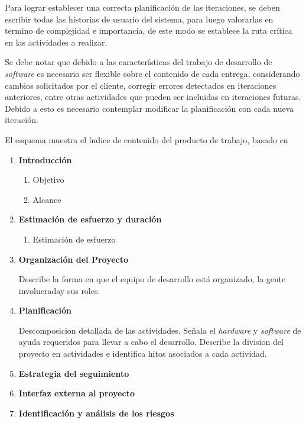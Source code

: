 Para lograr establecer una correcta planificación de las iteraciones, se deben escribir todas las historias de usuario del sistema, para luego valorarlas en termino de complejidad e importancia, de este modo se establece la ruta crítica en las actividades a realizar. 

Se debe notar que debido a las características del trabajo de desarrollo de \emph{software} es necesario ser flexible sobre el contenido de cada entrega, considerando cambios solicitados por el cliente, corregir errores detectados en iteraciones anteriores, entre otras actividades que pueden ser incluidas en iteraciones futuras. Debido a esto es necesario contemplar modificar la planificación con cada nueva iteración.

El esquema muestra el índice de contenido del producto de trabajo, basado en \citep{mem00}

\begin{framed}
     \begin{enumerate}
		\item \textbf{Introducción}
		\begin{enumerate}
			\item Objetivo
			\item Alcance 
		\end{enumerate}
		\item \textbf{Estimación de esfuerzo y duración}
		\begin{enumerate}
			\item Estimación de esfuerzo
		\end{enumerate}		
		\item \textbf{Organización del Proyecto}

		Describe la forma en que el equipo de desarrollo está organizado, la gente involucraday sus roles.
		\item \textbf{Planificación}

		Descomposicion detallada de las actividades. Señala el \emph{hardware} y \emph{software} de ayuda requeridos para llevar a cabo el desarrollo. Describe la division del proyecto en actividades e identifica hitos asociados a cada actividad.
		\item \textbf{Estrategia del seguimiento}
		\item \textbf{Interfaz externa al proyecto}
		\item \textbf{Identificación y análisis de los riesgos}
	\end{enumerate}
\end{framed}

